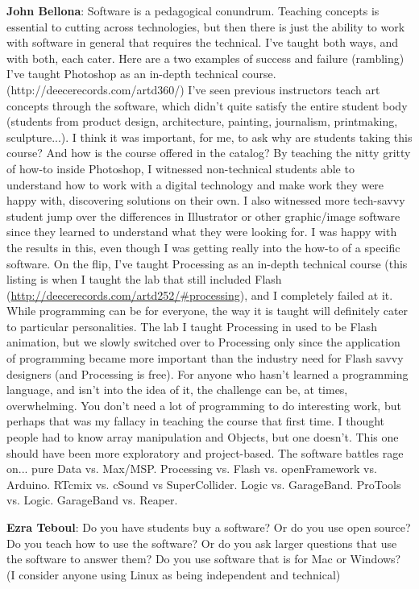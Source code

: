 \textbf{John Bellona}: Software is a pedagogical conundrum. Teaching concepts is
essential to cutting across technologies, but then there is just the ability to work
with software in general that requires the technical. I've taught both ways, and with
both, each cater. Here are a two examples of success and failure (rambling) I've taught
Photoshop as an in-depth technical course. (http://deecerecords.com/artd360/) I've seen
previous instructors teach art concepts through the software, which didn't quite satisfy
the entire student body (students from product design, architecture, painting,
journalism, printmaking, sculpture...). I think it was important, for me, to ask why are
students taking this course? And how is the course offered in the catalog? By teaching
the nitty gritty of how-to inside Photoshop, I witnessed non-technical students able to
understand how to work with a digital technology and make work they were happy with,
discovering solutions on their own. I also witnessed more tech-savvy student jump over
the differences in Illustrator or other graphic/image software since they learned to
understand what they were looking for. I was happy with the results in this, even though
I was getting really into the how-to of a specific software. On the flip, I've taught
Processing as an in-depth technical course (this listing is when I taught the lab that
still included Flash (\url{http://deecerecords.com/artd252/#processing}), and I
completely failed at it. While programming can be for everyone, the way it is taught
will definitely cater to particular personalities. The lab I taught Processing in used
to be Flash animation, but we slowly switched over to Processing only since the
application of programming became more important than the industry need for Flash savvy
designers (and Processing is free). For anyone who hasn't learned a programming
language, and isn't into the idea of it, the challenge can be, at times, overwhelming.
You don't need a lot of programming to do interesting work, but perhaps that was my
fallacy in teaching the course that first time. I thought people had to know array
manipulation and Objects, but one doesn't. This one should have been more exploratory
and project-based. The software battles rage on... pure Data vs. Max/MSP. Processing vs.
Flash vs. openFramework vs. Arduino. RTcmix vs. cSound vs SuperCollider. Logic vs.
GarageBand. ProTools vs. Logic. GarageBand vs. Reaper.

\textbf{Ezra Teboul}: Do you have students buy a software? Or do you use open source? Do
you teach how to use the software? Or do you ask larger questions that use the software
to answer them? Do you use software that is for Mac or Windows? (I consider anyone using
Linux as being independent and technical)

